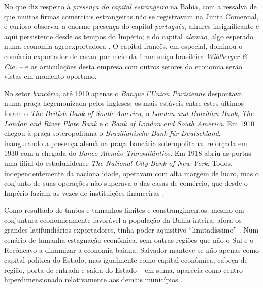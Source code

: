 No que diz respeito à \textit{presença do capital estrangeiro} na Bahia, com a ressalva de que muitas firmas comerciais estrangeiras não se registravam na Junta Comercial, é curioso observar a enorme presença do capital \textit{português}, alhures insignificante e aqui persistente desde os tempos do Império; e do capital \textit{alemão}, algo esperado numa economia agroexportadora \cite[p.~69-70]{CPE1980}. O capital francês, em especial, dominou o comércio exportador de cacau por meio da firma suíço-brasileira \textit{Wildberger \& Cia.} -- e as articulações desta empresa com outros setores da economia serão vistas em momento oportuno.

No setor \textit{bancário}, até 1910 apenas o \textit{Banque l'Union Parisienne} despontava numa praça hegemonizada pelos ingleses; os mais estáveis entre estes últimos foram o \textit{The British Bank of South America}, o \textit{London and Brazilian Bank}, \textit{The London and River Plate Bank} e o \textit{Bank of London and South America}. Em 1910 chegou à praça soteropolitana o \textit{Brazilianische Bank für Deutschland}, inaugurando a presença alemã na praça bancária soteropolitana, reforçada em 1930 com a chegada do \textit{Banco Alemão Transatlântico}. Em 1918 abriu as portas uma filial do estadunidense \textit{The National City Bank of New York}. Todos, independentemente da nacionalidade, operavam com alta margem de lucro, mas o conjunto de suas operações não superava o das casas de comércio, que desde o Império faziam as vezes de instituições financeiras \cite[p.~55]{CPE1980}.

Como resultado de tantos e tamanhos limites e constrangimentos, mesmo em conjuntura economicamente favorável a população da Bahia inteira, afora os grandes latifundiários exportadores, tinha poder aquisitivo ``limitadíssimo'' \cite[p.~189]{azevedolins_bancoba_1969}. Num cenário de tamanha estagnação econômica, sem outras regiões que não o Sul e o Recôncavo a dinamizar a economia baiana, Salvador manteve-se não apenas como capital política do Estado, mas igualmente como capital econômica, cabeça de região, porta de entrada e saída do Estado -- em suma, aparecia como centro hiperdimensionado relativamente aos demais municípios \cite[p.~63]{CPE1980}. 

